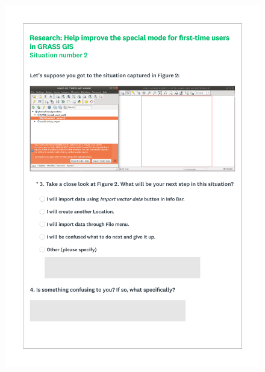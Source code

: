 \documentclass[a4paper,10pt,twoside]{article}
\begin{document}
 \newpage
 \begin{figure}[hbt!]
 \begin{center}
 \includegraphics[width=16cm]{../surveys/questionnaires/survey2-page4_questions3_4.pdf}
 \end{center}
 \end{figure}
 
\end{document}
